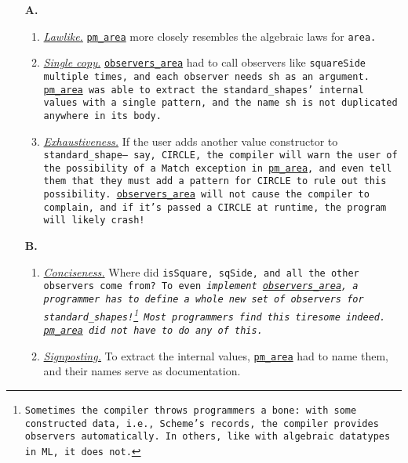 \documentclass[manuscript,screen,review, 12pt, nonacm]{acmart}
\begin{document}
    \begin{enumerate}
      \item [\textbf{A.}]
      \begin{enumerate}[label=\arabic*]
        \item \hyperref[p1]{\it{Lawlike.}}
        \hyperref[fig:pmarea]{\tt{pm\_area}} more closely resembles the
        algebraic laws for \tt{area}. 
        \item \hyperref[p2]{\it{Single copy.}}
        \hyperref[fig:observersarea]{\tt{observers\_area}} had to call observers
        like \tt{squareSide} multiple times, and each observer needs \tt{sh} as
        an argument. \hyperref[fig:pmarea]{\tt{pm\_area}} was able to extract
        the \tt{standard\_shape}s' internal values with a single pattern, and
        the name \tt{sh} is not duplicated anywhere in its body. 
        \item \hyperref[p5]{\it{Exhaustiveness.}} If the user adds another value constructor to
        \tt{standard\_shape}--- say, \tt{CIRCLE}, the compiler will warn the
        user of the possibility of a \tt{Match} exception in \hyperref[fig:pmarea]{\tt{pm\_area}}, and
        even tell them that they must add a pattern for \tt{CIRCLE} to rule out
        this possibility. \hyperref[fig:observersarea]{\tt{observers\_area}} will not cause the compiler to
        complain, and if it's passed a \tt{CIRCLE} at runtime, the program will
        likely crash! 
    \end{enumerate}
      
    \item [\textbf{B.}]
      \begin{enumerate}[start=4, label=\arabic*]
        \item \hyperref[p3]{\it{Conciseness.}} Where did \tt{isSquare}, \tt{sqSide}, and all the other
        observers come from? To even \it{implement} \hyperref[fig:observersarea]{\tt{observers\_area}}, a
        programmer has to define a whole new set of observers for
        \tt{standard\_shape}s!\footnote{Sometimes the compiler throws
        programmers a bone: with some constructed data, i.e., Scheme's records,
        the compiler provides observers automatically. In others, like with
        algebraic datatypes in ML, it does not.} Most programmers find this
        tiresome indeed. \hyperref[fig:pmarea]{\tt{pm\_area}} did not have to do any of this.
        \item \hyperref[p4]{\it{Signposting.}} To extract the internal values,
        \hyperref[fig:pmarea]{\tt{pm\_area}} had to name them, and their names
        serve as documentation. 
      \end{enumerate}
    \end{enumerate}
\end{document}
